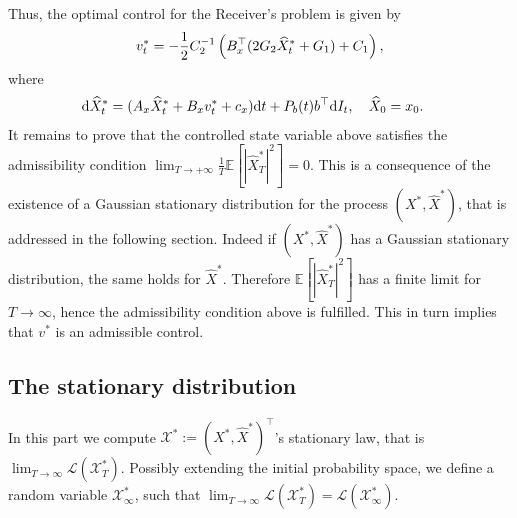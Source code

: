 \documentclass[a4paper,10pt]{article}
\newcommand{\D}{\mathrm{d}}
\newcommand{\Xx}{\mathcal{X}}
\theoremstyle{definition}
\theoremstyle{plain}
\numberwithin{equation}{section}
\begin{document}
Thus, the optimal control for the Receiver's problem is given by
\begin{align}\label{eq:v*}
    v^*_t  = - \frac{1}{2}C_2 ^{-1}\left( B_{\rm x} ^\top(2 G_2 \widehat X_t ^* + G_1) + C_1 \right),
\end{align}
where
\begin{align}	
	& \D \widehat X_t^* = (A_{\rm x} \widehat X_t^* + B_{\rm x} v_t^* + c_{\rm x})\D t + P_b(t) b^\top \D I_t , \quad \widehat X_0 =x_0. 
\end{align}
It remains to prove that the controlled state variable above satisfies the admissibility condition $\lim_{T \to +\infty} \frac{1}{T}\mathbb E[ | \widehat X^{*} _T|^2 ] = 0$. This is a consequence of the existence of a Gaussian stationary distribution for the process $(X^*, \widehat X^*)$, that is addressed in the following section. Indeed if $(X^*, \widehat X^*)$ has a Gaussian stationary distribution, the same holds for $\widehat X^*$. Therefore $\mathbb E [ | \widehat X^{*} _T|^2 ]$ has a finite limit for $T \to \infty$, hence the admissibility condition above is fulfilled.
This in turn implies that $v^*$ is an admissible control.



\subsection{The stationary distribution}\label{ssec:stationary}
In this part we compute $\Xx^*:=( X^*, \widehat{X}^*)^\top$'s stationary law, that  is  $\lim_{T\to \infty} \mathcal L(\Xx^*_T)$. Possibly extending the initial probability space,  we define  a random variable $\Xx^*_\infty$, such that  $\lim_{T\to \infty} \mathcal L(\Xx^*_T)=\mathcal L(\Xx^*_\infty)$.
\end{document}
